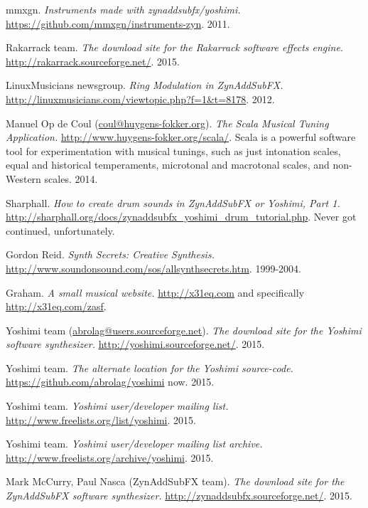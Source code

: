 \begin{thebibliography}{99}
   mmxgn.
   \emph{Instruments made with zynaddsubfx/yoshimi.}
   \url{https://github.com/mmxgn/instruments-zyn}.
   2011.

   Rakarrack team.
   \emph{The download site for the Rakarrack software effects engine.}
   \url{http://rakarrack.sourceforge.net/}.
   2015.

   LinuxMusicians newsgroup.
   \emph{Ring Modulation in ZynAddSubFX.}
   \url{http://linuxmusicians.com/viewtopic.php?f=1&t=8178}.
   2012.

   Manuel Op de Coul (\href{mailto:coul@huygens-fokker.org}{coul@huygens-fokker.org}).
   \emph{The Scala Musical Tuning Application.}
   \url{http://www.huygens-fokker.org/scala/}.
   Scala is a powerful software tool for experimentation with musical
   tunings, such as just intonation scales, equal and historical
   temperaments, microtonal and macrotonal scales, and non-Western scales.
   2014.

   Sharphall.
   \emph{How to create drum sounds in ZynAddSubFX or Yoshimi, Part 1.}
   \url{http://sharphall.org/docs/zynaddsubfx\_yoshimi\_drum\_tutorial.php}.
   Never got continued, unfortunately.

   Gordon Reid.
   \emph{Synth Secrets:  Creative Synthesis.}
   \url{http://www.soundonsound.com/sos/allsynthsecrets.htm}.
   1999-2004.

   Graham.
   \emph{A small musical website.}
   \url{http://x31eq.com} and specifically
   \url{http://x31eq.com/zasf}.

   Yoshimi team (\href{mailto:abrolag@users.sourceforge.net}{abrolag@users.sourceforge.net}).
   \emph{The download site for the Yoshimi software synthesizer.}
   \url{http://yoshimi.sourceforge.net/}.
   2015.

   Yoshimi team.
   \emph{The alternate location for the Yoshimi source-code.}
   \url{https://github.com/abrolag/yoshimi} now.
   2015.

   Yoshimi team.
   \emph{Yoshimi user/developer mailing list.}
   \url{http://www.freelists.org/list/yoshimi}.
   2015.

   Yoshimi team.
   \emph{Yoshimi user/developer mailing list archive.}
   \url{http://www.freelists.org/archive/yoshimi}.
   2015.

   Mark McCurry, Paul Nasca (ZynAddSubFX team).
   \emph{The download site for the ZynAddSubFX software synthesizer.}
   \url{http://zynaddsubfx.sourceforge.net/}.
   2015.


\end{thebibliography}
